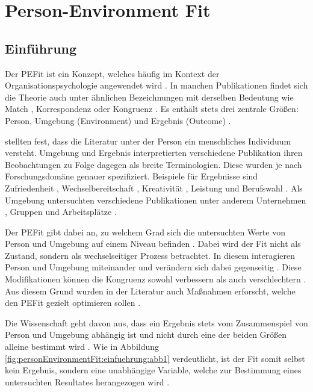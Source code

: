\chapter{Person-Environment Fit}
\label{ch:personEnvironmentFit}

\section{Einführung}
\label{ch:personEnvironmentFit:einfuehrung}
Der \ac{PEFit} \cite[S. 428]{dawis:2002} ist ein Konzept, welches häufig im Kontext der Organisationspsychologie angewendet wird \cite[S. 1ff.]{edwards:2008}. In manchen Publikationen findet sich die Theorie auch unter ähnlichen Bezeichnungen mit derselben Bedeutung wie Match \cite[S. 2]{player:2017}, Korrespondenz \cite[S. 1]{eggerth:2008} oder Kongruenz \cite[S. 1]{muchinsky:1987}. Es enthält stets drei zentrale Größen: Person, Umgebung (Environment) und Ergebnis (Outcome) \cite[S. 2f.]{livingstone:1997}.

\textcite[S. 5]{edwards:2007} stellten fest, dass die Literatur unter der Person ein menschliches Individuum versteht. Umgebung und Ergebnis interpretierten verschiedene Publikation ihren Beobachtungen zu Folge dagegen als breite Terminologien. Diese wurden je nach Forschungsdomäne genauer spezifiziert. Beispiele für Ergebnisse sind Zufriedenheit \cite[S. 1]{lashani:2021}, Wechselbereitschaft \cite[S. 1]{amarneh:2021}, Kreativität \cite[S. 1]{duan:2019}, Leistung \cite[S. 7f.]{elfenbein:2007} und  Berufswahl \cite[S. 1]{cable:1996}. Als Umgebung untersuchten verschiedene Publikationen unter anderem Unternehmen \cite[S. 1]{kristof:1996}, Gruppen \cite[S. 1]{werbel:2001} und Arbeitsplätze \cite[S. 1]{lu:2014}. 

Der \ac{PEFit} gibt dabei an, zu welchem Grad sich die untersuchten Werte von Person und Umgebung auf einem Niveau befinden \cite[S. 3]{chatman:1989}. Dabei wird der Fit nicht als Zustand, sondern als wechselseitiger Prozess betrachtet. In diesem interagieren Person und Umgebung miteinander und verändern sich dabei gegenseitig \cite[S. 21f.]{roberts:2006}. Diese Modifikationen können die Kongruenz sowohl verbessern als auch verschlechtern \cite[S. 4]{caplan:1987}. Aus diesem Grund wurden in der Literatur auch Maßnahmen erforscht, welche den \ac{PEFit} gezielt optimieren sollen \cite[S. 16]{cable:2001}.

Die Wissenschaft geht davon aus, dass ein Ergebnis stets vom Zusammenspiel von Person und Umgebung abhängig ist und nicht durch eine der beiden Größen alleine bestimmt wird \cite[S. 1]{muchinsky:1987}. Wie in Abbildung \ref{fig:personEnvironmentFit:einfuehrung:abb1} verdeutlicht, ist der Fit somit selbst kein Ergebnis, sondern eine unabhängige Variable, welche zur Bestimmung eines untersuchten Resultates herangezogen wird \cite[S. 4f.]{edwards:1991}.

